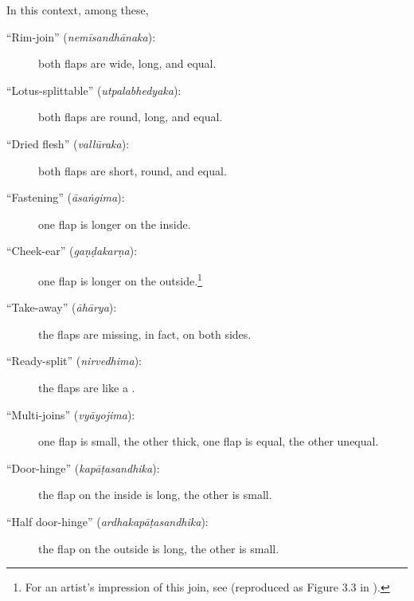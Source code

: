 \begin{translation}
    In this context, among these, 
    \begin{description}
        
        \item[\mdseries``Rim-join'' (\emph{nemīsandhānaka}):]
        both flaps are wide, long, and equal.
        
        \item[\mdseries``Lotus-splittable'' (\emph{utpalabhedyaka}):]
        both flaps are round, long, and equal.
        
        \item[\mdseries``Dried flesh'' (\emph{vallūraka}):]
        both flaps are short, round, and equal.
        
        \item[\mdseries``Fastening'' (\emph{āsaṅgima}):]
        one flap is longer on the inside.
        
        \item[\mdseries``Cheek-ear'' (\emph{gaṇḍakarṇa}):]
        one flap is longer on the outside.\footnote{For an artist's impression of this join, see \cite[291]{majn-1975} (reproduced as Figure 3.3 in \cites[155]{wuja-2003}).}
        
        \item[\mdseries``Take-away'' (\emph{āhārya}):]
        the flaps are missing, in fact, on both sides.
        
        \item[\mdseries``Ready-split'' (\emph{nirvedhima}):]
        the flaps are like a .
        
        \item[\mdseries``Multi-joins'' (\emph{vyāyojima}):]
        one flap is small, the other thick, one flap is equal, the other unequal.
        
        \item[\mdseries``Door-hinge'' (\emph{kapāṭasandhika}):]
        the flap on the inside is long, the other is small.
        
        \item[\mdseries``Half door-hinge'' (\emph{ardhakapāṭasandhika}):]
        the flap on the outside is long, the other is small.
    \end{description}


\end{translation}
